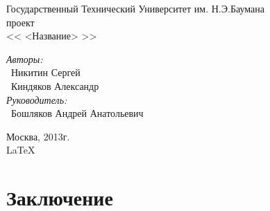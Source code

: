 \documentclass{article}
\begin{document}
\begin{titlepage}
\begin{center}
{ Государственный Технический Университет им. Н.Э.Баумана}
\\[50mm]
{ проект}
\\[7mm]
{\LARGE << <Название> >>}
\\[37mm]

\begin{flushright}
    \begin{minipage}{0.5\textwidth}
        \begin{flushleft}
            \textit{Авторы:} \\ 
            ~Никитин Сергей \\
            ~Киндяков Александр \\[10mm]
            \textit{Руководитель:} \\
            ~Бошляков Андрей Анатольевич
        \end{flushleft}
    \end{minipage}
\end{flushright}

\vfill %
Москва, 2013г. \\
\LaTeX
\end{center}
\end{titlepage}

\tableofcontents
\newpage





\newpage
\section{Заключение}


\end{document}
